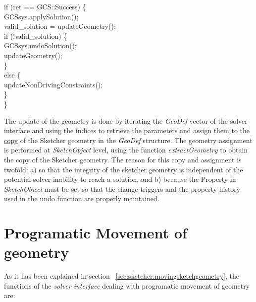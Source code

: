 \documentclass[12pt,twoside,a4paper]{book}
\newcommand{\SketchObject}{\emph{SketchObject}}
\begin{document}
    \begin{codequote}
    if (ret == GCS::Success) \{\\
    \-\hspace{0.5cm}GCSsys.applySolution();\\
    \-\hspace{0.5cm}    valid\_solution = updateGeometry();\\
    \-\hspace{0.5cm}   if (!valid\_solution) \{\\
    \-\hspace{1cm}        GCSsys.undoSolution();\\
    \-\hspace{1cm}        updateGeometry();\\
    \-\hspace{0.5cm}    \}\\
    \-\hspace{0.5cm}    else \{\\
    \-\hspace{1cm}        updateNonDrivingConstraints();\\
    \-\hspace{0.5cm}    \}\\
    \}
    \end{codequote}

    The update of the geometry is done by iterating the \emph{GeoDef} vector of the solver interface and using the indices to retrieve the parameters and assign them to the \underline{copy} of the Sketcher geometry in the \emph{GeoDef} structure. The geometry assignment is performed at \SketchObject{} level, using the function \emph{extractGeometry} to obtain the copy of the Sketcher geometry. The reason for this copy and assignment is twofold: a) so that the integrity of the sketcher geometry is independent of the potential solver inability to reach a solution, and b) because the Property in \SketchObject{} must be set so that the change triggers and the property history used in the undo function are properly maintained.

    \section{Programatic Movement of geometry}

    As it has been explained in section ~\ref{sec:sketcher:movingsketchgeometry}, the functions of the \emph{solver interface} dealing with programatic movement of geometry are:
\end{document}
